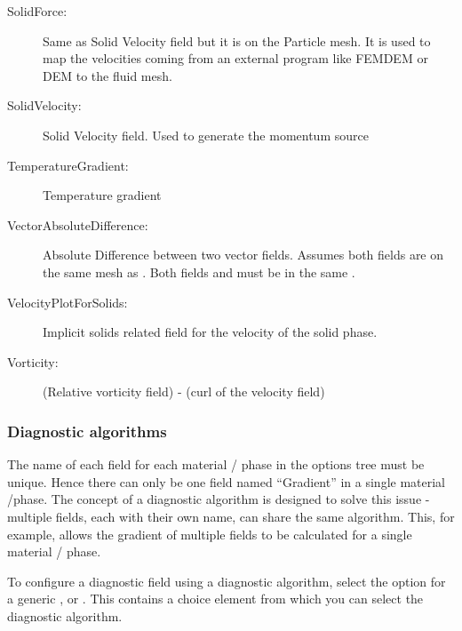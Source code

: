 \begin{description}
 \item[SolidForce:]Same as Solid Velocity field but it is on the Particle mesh. It is used to map the velocities coming from an external program like FEMDEM or DEM to the fluid mesh.    
 \item[SolidVelocity:]Solid Velocity field.  Used to generate the momentum source   
 \item[TemperatureGradient:]Temperature gradient
 \item[VectorAbsoluteDifference:]Absolute Difference between two vector fields. Assumes both fields are on the same mesh as . Both fields and  must be in the same .    
 \item[VelocityPlotForSolids:]Implicit solids related field for the velocity of the solid phase.
 \item[Vorticity:](Relative vorticity field) - (curl of the velocity field)    
\end{description}


\subsubsection{Diagnostic algorithms}\label{sec:diagnostic_algorithms}

The name of each field for each material / phase  in the options tree must be
unique. Hence there can only be one field named ``Gradient'' in a single
material /phase. The concept of a diagnostic algorithm is designed to solve this
issue - multiple fields, each with their own name, can share the same algorithm.
This, for example, allows the gradient of multiple fields to be calculated for a
single material / phase.

To configure a diagnostic field using a diagnostic algorithm, select the
 option for a generic , 
or . This contains a 
choice element from which you can select the diagnostic algorithm.

